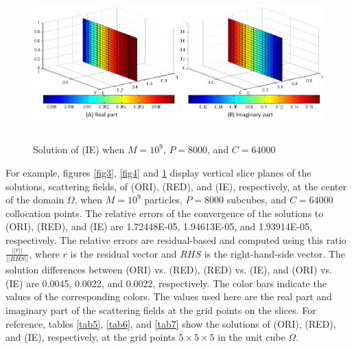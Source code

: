 \documentclass{wap}
\begin{document}
\begin{figure}[htbp]
	\centering
	\includegraphics[width=.7\linewidth,height=6cm]{1b_ie}
	\caption{Solution of (IE) when $M=10^9$, $P=8000$, and $C=64000$}
	\label{fig5}
\end{figure}

For example, figures \ref{fig3}, \ref{fig4} and \ref{fig5} display vertical slice planes of the solutions, scattering fields, of (ORI), (RED), and (IE), respectively, at the center of the domain $\Omega$, when $M=10^9$ particles, $P=8000$ subcubes, and $C=64000$ collocation points. The relative errors of the convergence of the solutions to (ORI), (RED), and (IE) are 1.72448E-05, 1.94613E-05, and 1.93914E-05, respectively. The relative errors are residual-based and computed using this ratio $\frac{||r||}{||RHS||}$, where $r$ is the residual vector and $RHS$ is the right-hand-side vector. The solution differences between (ORI) vs. (RED), (RED) vs. (IE), and (ORI) vs. (IE) are 0.0045, 0.0022, and 0.0022, respectively. The color bars indicate the  values of the corresponding colors. The values used here are the real part and imaginary part of the scattering fields at the grid points on the slices. For reference, tables \ref{tab5}, \ref{tab6}, and \ref{tab7} show the solutions of (ORI), (RED), and (IE), respectively, at the grid points $5\times 5\times 5$ in the unit cube $\Omega$.
\end{document}
